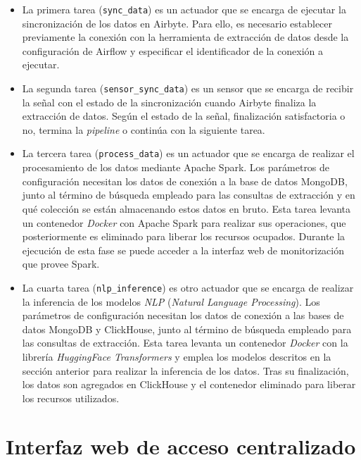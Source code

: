 \begin{itemize}
    \item La primera tarea (\texttt{sync\_data}) es un actuador que se encarga de ejecutar la sincronización de los datos en Airbyte. Para ello, es necesario establecer previamente la conexión con la herramienta de extracción de datos desde la configuración de Airflow y especificar el identificador de la conexión a ejecutar.

    \item La segunda tarea (\texttt{sensor\_sync\_data}) es un sensor que se encarga de recibir la señal con el estado de la sincronización cuando Airbyte finaliza la extracción de datos. Según el estado de la señal, finalización satisfactoria o no, termina la \textit{pipeline} o continúa con la siguiente tarea.

    \item La tercera tarea (\texttt{process\_data}) es un actuador que se encarga de realizar el procesamiento de los datos mediante Apache Spark. Los parámetros de configuración necesitan los datos de conexión a la base de datos MongoDB, junto al término de búsqueda empleado para las consultas de extracción y en qué colección se están almacenando estos datos en bruto. Esta tarea levanta un contenedor \textit{Docker} con Apache Spark para realizar sus operaciones, que posteriormente es eliminado para liberar los recursos ocupados. Durante la ejecución de esta fase se puede acceder a la interfaz web de monitorización que provee Spark.

    \item La cuarta tarea (\texttt{nlp\_inference}) es otro actuador que se encarga de realizar la inferencia de los modelos \textit{NLP} (\textit{Natural Language Processing}). Los parámetros de configuración necesitan los datos de conexión a las bases de datos MongoDB y ClickHouse, junto al término de búsqueda empleado para las consultas de extracción. Esta tarea levanta un contenedor \textit{Docker} con la librería \textit{HuggingFace Transformers} y emplea los modelos descritos en la sección anterior para realizar la inferencia de los datos. Tras su finalización, los datos son agregados en ClickHouse y el contenedor eliminado para liberar los recursos utilizados.
\end{itemize}


\section{Interfaz web de acceso centralizado}

